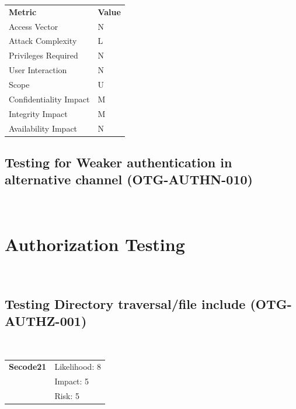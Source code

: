 \documentclass[headsepline,footsepline,footinclude=false,oneside,fontsize=11pt,paper=a4,listof=totoc,bibliography=totoc]{scrbook} %
\begin{document}
\begin{center}
	\begin{tabular}{ll}
		\rowcolor[HTML]{34CDF9}
		{\color[HTML]{ECF4FF} \textbf{Metric}}        & {\color[HTML]{ECF4FF} \textbf{Value}} \\
		\rowcolor[HTML]{BBDAFF}
		{\color[HTML]{333333} Access Vector}          & {\color[HTML]{333333} } N              \\
		\rowcolor[HTML]{ECF4FF}
		{\color[HTML]{333333} Attack Complexity}      & {\color[HTML]{333333} } L              \\
		\rowcolor[HTML]{BBDAFF}
		{\color[HTML]{333333} Privileges Required}    & {\color[HTML]{333333} } N              \\
		\rowcolor[HTML]{ECF4FF}
		{\color[HTML]{333333} User Interaction}       & {\color[HTML]{333333} } N              \\
		\rowcolor[HTML]{BBDAFF}
		{\color[HTML]{333333} Scope}                  & {\color[HTML]{333333} } U              \\
		\rowcolor[HTML]{ECF4FF}
		{\color[HTML]{333333} Confidentiality Impact} & {\color[HTML]{333333} } M              \\
		\rowcolor[HTML]{BBDAFF}
		{\color[HTML]{333333} Integrity Impact}       & {\color[HTML]{333333} } M              \\
		\rowcolor[HTML]{ECF4FF}
		{\color[HTML]{333333} Availability Impact}    & {\color[HTML]{333333} } N
	\end{tabular}
\end{center}

 
\pagebreak
\subsection{Testing for Weaker authentication in alternative channel (OTG-AUTHN-010)}\

\pagebreak
\section{Authorization Testing}\
\subsection{Testing Directory traversal/file include (OTG-AUTHZ-001)}\
 \begin{tabular}{cR{12cm}}
	\textbf{Secode21} & Likelihood: 8\\& Impact: 5\\& Risk: 5
\end{tabular}
\end{document}
